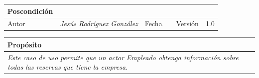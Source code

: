 \begin{table}[H]
\begin{tabular}{llllllll}
        \multicolumn{1}{|l|}{Poscondición}                           & \multicolumn{7}{l|}{{\color[HTML]{808080} \textit{}}}                                                                                                                                                                                                                                                       \\ \hline
        \multicolumn{1}{|l|}{Autor}                                  & \multicolumn{1}{l|}{{\color[HTML]{808080} \textit{Jesús Rodríguez González}}}                           & \multicolumn{2}{l|}{Fecha}                                                   & \multicolumn{1}{l|}{}                          & \multicolumn{2}{l|}{Versión}                                                      & \multicolumn{1}{l|}{1.0}                                                     \\ \hline
        \end{tabular}
        \end{table}

        \begin{table}[H]
            \begin{tabular}{llllllll}
        \hline
        \multicolumn{8}{|l|}{\cellcolor[HTML]{F2F2F2}Propósito}                                                                                                                                                                                                                                                                                                                                                                                           \\ \hline
        \multicolumn{8}{|p{15cm}|}{{\color[HTML]{808080} \textit{Este caso de uso permite que un actor Empleado obtenga
        información sobre todas las reservas que tiene la empresa.}}}                                                                                                                                                                                                             \\ \hline
        \end{tabular}
        \end{table}

